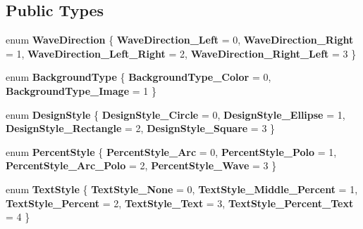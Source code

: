 \subsection*{Public Types}
\begin{DoxyCompactItemize}
\item 
\mbox{\label{class_q_qt_custom_progress_bar_af40ff21e192d9ad56bbe78d2bc5507ad}} 
enum {\bfseries Wave\+Direction} \{ {\bfseries Wave\+Direction\+\_\+\+Left} = 0, 
{\bfseries Wave\+Direction\+\_\+\+Right} = 1, 
{\bfseries Wave\+Direction\+\_\+\+Left\+\_\+\+Right} = 2, 
{\bfseries Wave\+Direction\+\_\+\+Right\+\_\+\+Left} = 3
 \}
\item 
\mbox{\label{class_q_qt_custom_progress_bar_a8d3b8cae3bf7a276be31a47451b4bb43}} 
enum {\bfseries Background\+Type} \{ {\bfseries Background\+Type\+\_\+\+Color} = 0, 
{\bfseries Background\+Type\+\_\+\+Image} = 1
 \}
\item 
\mbox{\label{class_q_qt_custom_progress_bar_abe03860152744c4ea9aeed264c0cc1e6}} 
enum {\bfseries Design\+Style} \{ {\bfseries Design\+Style\+\_\+\+Circle} = 0, 
{\bfseries Design\+Style\+\_\+\+Ellipse} = 1, 
{\bfseries Design\+Style\+\_\+\+Rectangle} = 2, 
{\bfseries Design\+Style\+\_\+\+Square} = 3
 \}
\item 
\mbox{\label{class_q_qt_custom_progress_bar_affd78c4236bda18b1d44f99de5771f43}} 
enum {\bfseries Percent\+Style} \{ {\bfseries Percent\+Style\+\_\+\+Arc} = 0, 
{\bfseries Percent\+Style\+\_\+\+Polo} = 1, 
{\bfseries Percent\+Style\+\_\+\+Arc\+\_\+\+Polo} = 2, 
{\bfseries Percent\+Style\+\_\+\+Wave} = 3
 \}
\item 
\mbox{\label{class_q_qt_custom_progress_bar_af6aa86848a914a45956cc449830a1d5d}} 
enum {\bfseries Text\+Style} \{ \newline
{\bfseries Text\+Style\+\_\+\+None} = 0, 
{\bfseries Text\+Style\+\_\+\+Middle\+\_\+\+Percent} = 1, 
{\bfseries Text\+Style\+\_\+\+Percent} = 2, 
{\bfseries Text\+Style\+\_\+\+Text} = 3, 
\newline
{\bfseries Text\+Style\+\_\+\+Percent\+\_\+\+Text} = 4
 \}
\end{DoxyCompactItemize}
